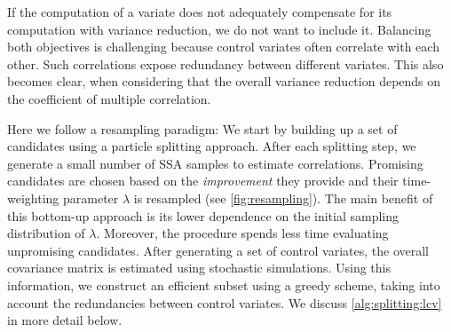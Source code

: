 
If the computation of a variate does not adequately compensate for its computation
with variance reduction, we do not want to include it.
Balancing both objectives is challenging because control variates often correlate with each other.
Such correlations expose redundancy between different variates.
This also becomes clear, when considering that the overall variance reduction  depends on
the coefficient of multiple correlation.

Here we follow a resampling paradigm:
We start by building up a set of candidates using a particle splitting approach.
After each splitting step, we generate a small number of \ac{SSA} samples to estimate correlations.
Promising candidates are chosen based on the \emph{improvement} they provide and their time-weighting parameter $\lambda$ is resampled (see \autoref{fig:resampling}).
The main benefit of this bottom-up approach is its lower dependence on the initial sampling distribution of $\lambda$.
Moreover, the procedure spends less time evaluating unpromising candidates.
After   generating a set of control variates, the overall covariance matrix is estimated using stochastic simulations.
Using this information, we construct an efficient subset using a greedy scheme, taking into account the redundancies between control variates.
We discuss \autoref{alg:splitting:lcv} in more detail below.

